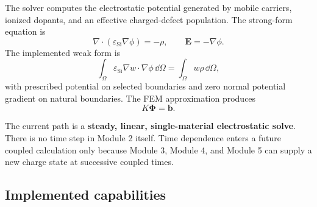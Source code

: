 \documentclass[11pt]{article}
\newcommand{\phivec}{\bm{\Phi}}
\newcommand{\Evec}{\mathbf{E}}
\begin{document}
The solver computes the electrostatic potential generated by mobile carriers, ionized dopants, and an effective charged-defect population. The strong-form equation is
\begin{equation}
\nabla\cdot\left(\varepsilon_{\mathrm{Si}}\nabla\phi\right)=-\rho,
\qquad
\Evec=-\nabla\phi.
\end{equation}
The implemented weak form is
\begin{equation}
\int_{\Omega}\varepsilon_{\mathrm{Si}}\nabla w\cdot\nabla\phi\,\dd\Omega
=
\int_{\Omega}w\rho\,\dd\Omega,
\end{equation}
with prescribed potential on selected boundaries and zero normal potential gradient on natural boundaries. The FEM approximation produces
\begin{equation}
K\phivec=\mathbf{b}.
\end{equation}

The current path is a \textbf{steady, linear, single-material electrostatic solve}. There is no time step in Module 2 itself. Time dependence enters a future coupled calculation only because Module 3, Module 4, and Module 5 can supply a new charge state at successive coupled times.

\subsection{Implemented capabilities}
\end{document}
